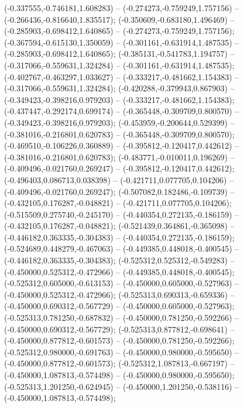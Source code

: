  (-0.337555,-0.746181,1.608283) -- (-0.274273,-0.759249,1.757156) -- (-0.266436,-0.816640,1.835517);
 (-0.350609,-0.683180,1.496469) -- (-0.285903,-0.698412,1.640865) -- (-0.274273,-0.759249,1.757156);
 (-0.367594,-0.615130,1.350059) -- (-0.301161,-0.631914,1.487535) -- (-0.285903,-0.698412,1.640865);
 (-0.385131,-0.541783,1.194757) -- (-0.317066,-0.559631,1.324284) -- (-0.301161,-0.631914,1.487535);
 (-0.402767,-0.463297,1.033627) -- (-0.333217,-0.481662,1.154383) -- (-0.317066,-0.559631,1.324284);
 (-0.420288,-0.379943,0.867903) -- (-0.349423,-0.398216,0.979203) -- (-0.333217,-0.481662,1.154383);
 (-0.437447,-0.292174,0.699174) -- (-0.365448,-0.309709,0.800570) -- (-0.349423,-0.398216,0.979203);
 (-0.453959,-0.200644,0.529399) -- (-0.381016,-0.216801,0.620783) -- (-0.365448,-0.309709,0.800570);
 (-0.469510,-0.106226,0.360889) -- (-0.395812,-0.120417,0.442612) -- (-0.381016,-0.216801,0.620783);
 (-0.483771,-0.010011,0.196269) -- (-0.409496,-0.021760,0.269247) -- (-0.395812,-0.120417,0.442612);
 (-0.496403,0.086713,0.038398) -- (-0.421711,0.077705,0.104206) -- (-0.409496,-0.021760,0.269247);
 (-0.507082,0.182486,-0.109739) -- (-0.432105,0.176287,-0.048821) -- (-0.421711,0.077705,0.104206);
 (-0.515509,0.275740,-0.245170) -- (-0.440354,0.272135,-0.186159) -- (-0.432105,0.176287,-0.048821);
 (-0.521439,0.364861,-0.365098) -- (-0.446182,0.363335,-0.304383) -- (-0.440354,0.272135,-0.186159);
 (-0.524689,0.448279,-0.467063) -- (-0.449385,0.448018,-0.400545) -- (-0.446182,0.363335,-0.304383);
 (-0.525312,0.525312,-0.549283) -- (-0.450000,0.525312,-0.472966) -- (-0.449385,0.448018,-0.400545);
 (-0.525312,0.605000,-0.613153) -- (-0.450000,0.605000,-0.527963) -- (-0.450000,0.525312,-0.472966);
 (-0.525313,0.690313,-0.659336) -- (-0.450000,0.690312,-0.567729) -- (-0.450000,0.605000,-0.527963);
 (-0.525313,0.781250,-0.687832) -- (-0.450000,0.781250,-0.592266) -- (-0.450000,0.690312,-0.567729);
 (-0.525313,0.877812,-0.698641) -- (-0.450000,0.877812,-0.601573) -- (-0.450000,0.781250,-0.592266);
 (-0.525312,0.980000,-0.691763) -- (-0.450000,0.980000,-0.595650) -- (-0.450000,0.877812,-0.601573);
 (-0.525312,1.087813,-0.667197) -- (-0.450000,1.087813,-0.574498) -- (-0.450000,0.980000,-0.595650);
 (-0.525313,1.201250,-0.624945) -- (-0.450000,1.201250,-0.538116) -- (-0.450000,1.087813,-0.574498);
